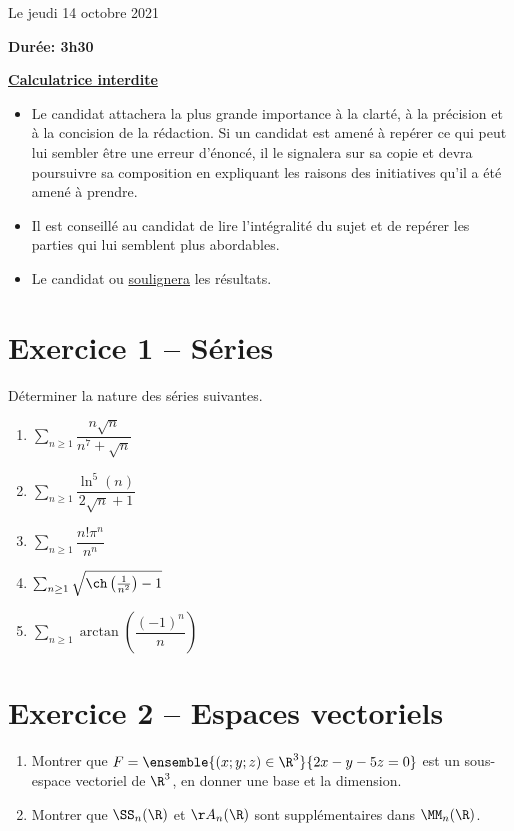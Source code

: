\documentclass[twoside,french,11pt]{VcCours}
\begin{document}

\begin{center}
\large 
Le jeudi 14 octobre 2021

\bigskip
\textbf{Durée: 3h30}

\bigskip
\large\underline{\textbf{Calculatrice interdite}}
\end{center}

\bigskip
\begin{itemize}
  \item Le candidat attachera la plus grande importance à la clarté, à la précision et à la concision de la rédaction. Si un candidat est amené à repérer ce qui peut lui sembler être une erreur d'énoncé, il le signalera sur sa copie et devra poursuivre sa composition en expliquant les raisons des initiatives qu'il a été amené à prendre.
  \item Il est conseillé au candidat de lire l'intégralité du sujet et de repérer les parties qui lui semblent plus abordables.
  \item Le candidat  ou \underline{soulignera} les résultats. 
  \end{itemize}
\separationTitre


\section*{Exercice 1 -- Séries}
  Déterminer la nature des séries suivantes. 
  
  \begin{multicols}{3}
  \begin{enumerate}
  \item $\sum_{n \geq 1} \dfrac{n\sqrt{n}}{n^7+\sqrt{n}}$
  \item $\sum_{n \geq 1} \dfrac{\ln^{5}(n)}{2\sqrt{n}+1}$
  \columnbreak
  \item $\sum_{n \geq 1} \dfrac{n!\pi^n}{n^n}$
  \item $\sum_{n \geq 1} \sqrt{\ch\left(\frac{1}{n^2}\right)-1}$
  \columnbreak
  \item $\sum_{n \geq 1} \arctan \left( \dfrac{(-1)^n}{n}\right)$
  \end{enumerate}
  \end{multicols}

\section*{Exercice 2 -- Espaces vectoriels}
\begin{enumerate}
  \item Montrer que $F=\ensemble{(x;y;z)\in\R^3}{2x-y-5z=0}$ est un sous-espace
  vectoriel de $\R^3$, en donner une base et la dimension.
  \item Montrer que $\SS_n(\R)$ et $\AA_n(\R)$ sont supplémentaires dans $\MM_n(\R)$.
\end{enumerate}
\end{document}
